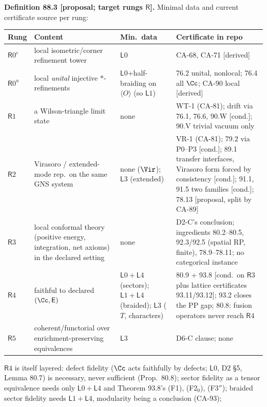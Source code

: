\textbf{Definition 88.3 [proposal; target rungs \(\mathsf R\)].}  Minimal data and current certificate source per rung:
\begin{center}\footnotesize
\begin{tabular}{p{0.9cm}p{5.6cm}p{1.6cm}p{5.6cm}}
\toprule
Rung & Content & Min.\ data & Certificate in repo \\
\midrule
\(\mathsf R0^{c}\) & local isometric/corner refinement tower & \(\mathsf L0\) & CA-68, CA-71 [derived] \\
\(\mathsf R0^{u}\) & local \emph{unital} injective \(*\)-refinements & \(\mathsf L0\)+half-braiding on \(\langle O\rangle\) (so \(\mathsf L1\)) & 76.2 unital, nonlocal; 76.4 all \(\Cc\); CA-90 local [derived] \\
\(\mathsf R1\) & a Wilson-triangle limit state & none & WT-1 (CA-81); drift via 76.1, 76.6, 90.W [cond.]; 90.V trivial vacuum only \\
\(\mathsf R2\) & Virasoro / extended-mode rep.\ on the same GNS system & none (\(\Vir\)); \(\mathsf L3\) (extended) & VR-1 (CA-81); 79.2 via P0--P3 [cond.]; 89.1 transfer interfaces, Virasoro form forced by consistency [cond.]; 91.1, 91.5 two families [cond.]; 78.13 [proposal, split by CA-89] \\
\(\mathsf R3\) & local conformal theory (positive energy, integration, net axioms) in the declared setting & none & D2-C's conclusion; ingredients 80.2--80.5, 92.3/92.5 (spatial RP, finite), 78.9--78.11; no categorical instance \\
\(\mathsf R4\) & faithful to declared \((\Cc,\mathsf E)\) & \(\mathsf L0{+}\mathsf L4\) (sectors); \(\mathsf L1{+}\mathsf L4\) (braided); \(\mathsf L3\) (\(T\), characters) & 80.9 + 93.8 [cond.\ on \(\mathsf R3\) plus lattice certificates 93.11/93.12]; 93.2 closes the PP gap; 80.8: fusion operators never reach \(\mathsf R4\) \\
\(\mathsf R5\) & coherent/functorial over enrichment-preserving equivalences & \(\mathsf L3\) & D6-C clause; none \\
\bottomrule
\end{tabular}
\end{center}
\(\mathsf R4\) is itself layered: defect fidelity (\(\Cc\) acts faithfully by defects; \(\mathsf L0\), D2 \S5, Lemma 80.7) is
necessary, never sufficient (Prop.~80.8); sector fidelity as a tensor equivalence needs only \(\mathsf L0{+}\mathsf L4\) and Theorem
93.8's (F1), (F2\(_0\)), (F3\(''\)); braided sector fidelity needs \(\mathsf L1{+}\mathsf L4\), modularity being a conclusion (CA-93);
